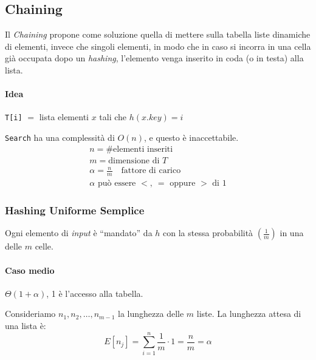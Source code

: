 \subsection{Chaining}\label{hash:chaining}
Il \emph{Chaining} propone come soluzione quella di mettere sulla tabella liste dinamiche
di elementi, invece che singoli elementi, in modo che in caso si incorra in una cella
già occupata dopo un \emph{hashing}, l'elemento venga inserito in coda (o in testa) alla
lista.

\paragraph{Idea} \texttt{T[i]} $=$ lista elementi $x$ tali che $h(x.key) = i$




\texttt{Search} ha una complessità di $O(n)$, e questo è inaccettabile.
\begin{gather*}
	n = \text{\# elementi inseriti} \\
	m = \text{dimensione di } T \\
	\alpha = \frac{n}{m} \quad \text{fattore di carico} \\
	\alpha \text{ può essere }<, \ = \text{ oppure } > \text{ di } 1
\end{gather*}

\subsubsection{Hashing Uniforme Semplice}
Ogni elemento di \emph{input} è ``mandato'' da $h$ con la stessa probabilità $\left( \frac{1}{m} \right)$
in una delle $m$ celle.

\paragraph{Caso medio} $\Theta(1 + \alpha)$, 1 è l'accesso alla tabella.\par
Consideriamo $n_1,n_2,\dots,n_{m-1}$ la lunghezza delle $m$ liste. La lunghezza attesa
di una lista è:
$$E[n_j] = \displaystyle\sum_{i = 1}^{n} \frac{1}{m} \cdot 1 = \frac{n}{m} = \alpha$$

